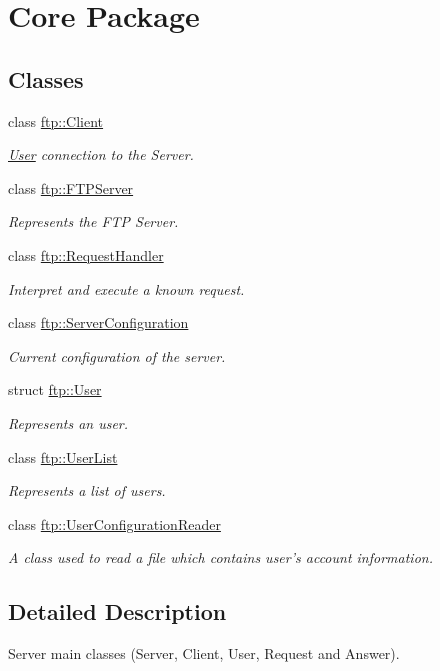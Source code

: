 \hypertarget{group__core}{\section{Core Package}
\label{group__core}
}
\subsection*{Classes}
\begin{DoxyCompactItemize}
\item 
class \hyperlink{classftp_1_1_client}{ftp\-::\-Client}
\begin{DoxyCompactList}\small\item\em \hyperlink{structftp_1_1_user}{User} connection to the Server. \end{DoxyCompactList}\item 
class \hyperlink{classftp_1_1_f_t_p_server}{ftp\-::\-F\-T\-P\-Server}
\begin{DoxyCompactList}\small\item\em Represents the F\-T\-P Server. \end{DoxyCompactList}\item 
class \hyperlink{classftp_1_1_request_handler}{ftp\-::\-Request\-Handler}
\begin{DoxyCompactList}\small\item\em Interpret and execute a known request. \end{DoxyCompactList}\item 
class \hyperlink{classftp_1_1_server_configuration}{ftp\-::\-Server\-Configuration}
\begin{DoxyCompactList}\small\item\em Current configuration of the server. \end{DoxyCompactList}\item 
struct \hyperlink{structftp_1_1_user}{ftp\-::\-User}
\begin{DoxyCompactList}\small\item\em Represents an user. \end{DoxyCompactList}\item 
class \hyperlink{classftp_1_1_user_list}{ftp\-::\-User\-List}
\begin{DoxyCompactList}\small\item\em Represents a list of users. \end{DoxyCompactList}\item 
class \hyperlink{classftp_1_1_user_configuration_reader}{ftp\-::\-User\-Configuration\-Reader}
\begin{DoxyCompactList}\small\item\em A class used to read a file which contains user's account information. \end{DoxyCompactList}\end{DoxyCompactItemize}


\subsection{Detailed Description}
Server main classes (Server, Client, User, Request and Answer). 